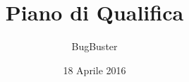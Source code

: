 



\title{\textbf{Piano di Qualifica}}
\author{BugBuster}

\date{18 Aprile 2016}




\makeFrontPage

\tableofcontents





